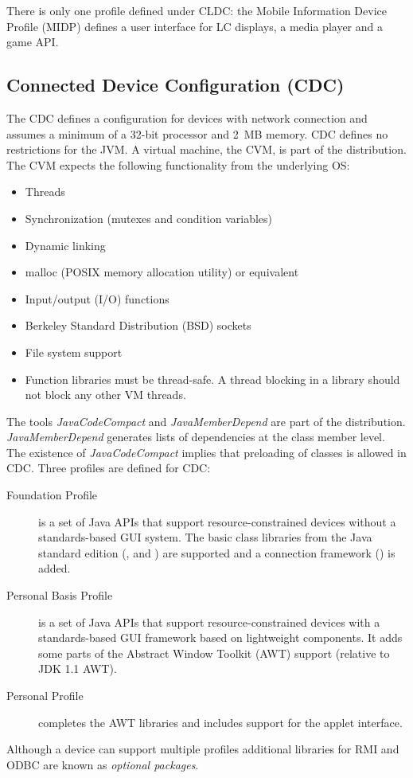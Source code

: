 There is only one profile defined under CLDC: the Mobile Information
Device Profile (MIDP) defines a user interface for LC displays,
a media player and a game API.

\subsection{Connected Device Configuration (CDC)}

The CDC defines a configuration for devices with network connection
and assumes a minimum of a 32-bit processor and 2~MB memory. CDC
defines no restrictions for the JVM. A virtual machine, the CVM, is
part of the distribution. The CVM expects the following
functionality from the underlying OS:
%
\begin{itemize}
    \item Threads
    \item Synchronization (mutexes and condition variables)
    \item Dynamic linking
    \item malloc (POSIX memory allocation utility) or equivalent
    \item Input/output (I/O) functions
    \item Berkeley Standard Distribution (BSD) sockets
    \item File system support
    \item Function libraries must be thread-safe. A thread blocking in a library should not block any other VM threads.
\end{itemize}
%
The tools \textit{JavaCodeCompact} and \textit{JavaMemberDepend} are
part of the distribution. \textit{JavaMemberDepend} generates lists
of dependencies at the class member level. The existence of
\textit{JavaCodeCompact} implies that preloading of classes is
allowed in CDC. Three profiles are defined for CDC:
%
\begin{description}
    \item[Foundation Profile] is a set of Java APIs that support resource-constrained
devices without a standards-based GUI system. The basic class
libraries from the Java standard edition (,
 and ) are supported and a connection
framework () is added.

    \item[Personal Basis Profile] is a set of Java APIs that support
resource-constrained devices with a standards-based GUI framework
based on lightweight components. It adds some parts of the Abstract
Window Toolkit (AWT) support (relative to JDK 1.1 AWT).

    \item[Personal Profile] completes the AWT libraries and includes support for the
applet interface.

\end{description}
%
Although a device can support multiple profiles additional libraries
for RMI and ODBC are known as \textit{optional packages}.

